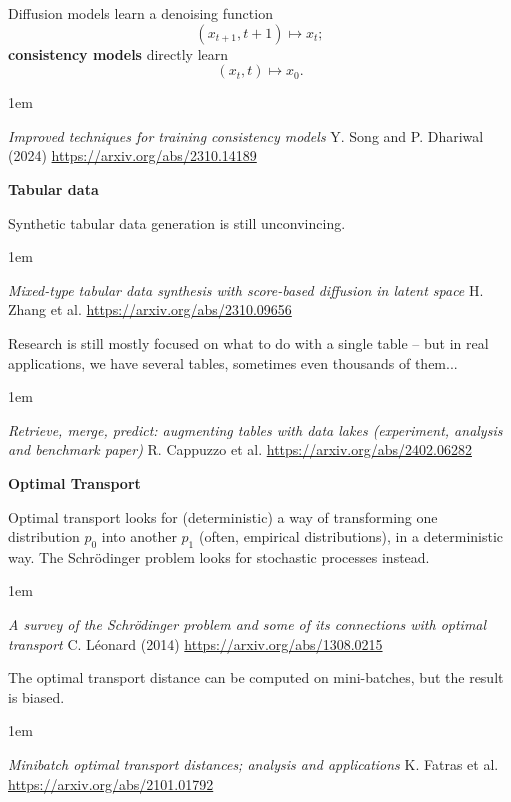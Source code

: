 \documentclass[a5paper]{article}
\let\d\textbf
\newenvironment{reference}{%
  \medskip\goodbreak
  \parskip 0pt
  \raggedright
  \leftskip 1em
  \obeylines
}{\par\medskip\goodbreak}
\def\subsection#1{{\par\bigskip\goodbreak\large\bfseries #1\par}}
\begin{document}
Diffusion models learn a denoising function
\[ (x_{t+1} , t+1 ) \longmapsto x_t ; \]
\d{consistency models} directly learn
\[ (x_t, t ) \longmapsto x_0. \]

\begin{reference}
  \emph{Improved techniques for training consistency models}
  Y. Song and P. Dhariwal (2024)
  \url{https://arxiv.org/abs/2310.14189}
\end{reference}

\subsection{Tabular data}

Synthetic tabular data generation is still unconvincing.

\begin{reference}
  \emph{Mixed-type tabular data synthesis with score-based diffusion in latent space}
  H. Zhang et al.
  \url{https://arxiv.org/abs/2310.09656}
\end{reference}

Research is still mostly focused on what to do with a single table -- but in real applications,
we have several tables, sometimes even thousands of them...

\begin{reference}
  \emph{Retrieve, merge, predict: augmenting tables with data lakes (experiment, analysis and benchmark paper)}
  R. Cappuzzo et al.
  \url{https://arxiv.org/abs/2402.06282}
\end{reference}

\subsection{Optimal Transport}

Optimal transport looks for (deterministic) a way of transforming one distribution $p_0$ into another $p_1$
(often, empirical distributions), in a deterministic way.
The Schrödinger problem looks for stochastic processes instead. 

\begin{reference}
  \emph{A survey of the Schrödinger problem and some of its connections with optimal transport}
  C. Léonard (2014)
  \url{https://arxiv.org/abs/1308.0215}
\end{reference}

The optimal transport distance can be computed on mini-batches, but the result is biased.

\begin{reference}
  \emph{Minibatch optimal transport distances; analysis and applications}
  K. Fatras et al.
  \url{https://arxiv.org/abs/2101.01792}
\end{reference}
\end{document}
